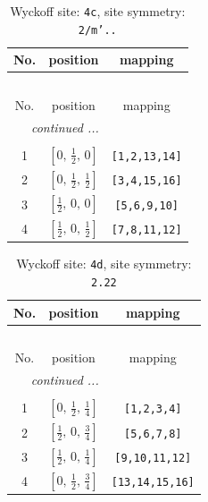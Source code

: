 \documentclass[fleqn,8pt]{jsarticle}
\begin{document}
\renewcommand{\arraystretch}{1.2}
\begin{longtable}{ccc}
\caption{Wyckoff site: {\tt 4c}, site symmetry: {\tt 2/m'..}}
 \\
 \hline \hline
No. & position & mapping \\ \hline \endfirsthead

\multicolumn{2}{l}{\tablename\ \thetable{}} \\
 \hline \hline
No. & position & mapping \\ \hline \endhead

 \hline \hline
\multicolumn{2}{r}{\footnotesize\it continued ...} \\ \endfoot

 \hline \hline
\multicolumn{2}{r}{} \\ \endlastfoot

1 & $\left[ 0,\, \frac{1}{2},\, 0 \right]$ & {\tt [1,2,13,14]} \\ \hline
2 & $\left[ 0,\, \frac{1}{2},\, \frac{1}{2} \right]$ & {\tt [3,4,15,16]} \\ \hline
3 & $\left[ \frac{1}{2},\, 0,\, 0 \right]$ & {\tt [5,6,9,10]} \\ \hline
4 & $\left[ \frac{1}{2},\, 0,\, \frac{1}{2} \right]$ & {\tt [7,8,11,12]} \\
\end{longtable}
\renewcommand{\arraystretch}{1.2}
\begin{longtable}{ccc}
\caption{Wyckoff site: {\tt 4d}, site symmetry: {\tt 2.22}}
 \\
 \hline \hline
No. & position & mapping \\ \hline \endfirsthead

\multicolumn{2}{l}{\tablename\ \thetable{}} \\
 \hline \hline
No. & position & mapping \\ \hline \endhead

 \hline \hline
\multicolumn{2}{r}{\footnotesize\it continued ...} \\ \endfoot

 \hline \hline
\multicolumn{2}{r}{} \\ \endlastfoot

1 & $\left[ 0,\, \frac{1}{2},\, \frac{1}{4} \right]$ & {\tt [1,2,3,4]} \\ \hline
2 & $\left[ \frac{1}{2},\, 0,\, \frac{3}{4} \right]$ & {\tt [5,6,7,8]} \\ \hline
3 & $\left[ \frac{1}{2},\, 0,\, \frac{1}{4} \right]$ & {\tt [9,10,11,12]} \\ \hline
4 & $\left[ 0,\, \frac{1}{2},\, \frac{3}{4} \right]$ & {\tt [13,14,15,16]} \\
\end{longtable}
\end{document}
